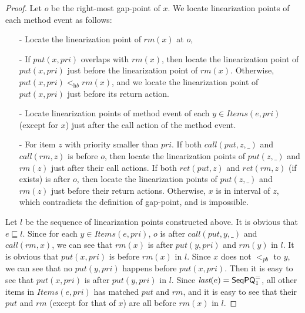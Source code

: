 \begin {proof}

Let $o$ be the right-most gap-point of $x$. We locate linearization points of each method event as follows:

\begin{itemize}
\setlength{\itemsep}{0.5pt}
\item[-] Locate the linearization point of $\textit{rm}(x)$ at $o$,

\item[-] If $\textit{put}(x,\textit{pri})$ overlaps with $\textit{rm}(x)$, then locate the linearization point of $\textit{put}(x,\textit{pri})$ just before the linearization point of $\textit{rm}(x)$. Otherwise, $\textit{put}(x,\textit{pri}) <_{\textit{hb}} \textit{rm}(x)$, and we locate the linearization point of $\textit{put}(x,\textit{pri})$ just before its return action.

\item[-] Locate linearization points of method event of each $y \in \textit{Items}(e,\textit{pri})$ (except for $x$) just after the call action of the method event.

\item[-] For item $z$ with priority smaller than $\textit{pri}$. If both $\textit{call}(\textit{put},z,\_)$ and $\textit{call}(\textit{rm},z)$ is before $o$, then locate the linearization points of $\textit{put}(z,\_)$ and $\textit{rm}(z)$ just after their call actions. If both $\textit{ret}(\textit{put},z)$ and $\textit{ret}(\textit{rm},z)$ (if exists) is after $o$, then locate the linearization points of $\textit{put}(z,\_)$ and $\textit{rm}(z)$ just before their return actions. Otherwise, $x$ is in interval of $z$, which contradicts the definition of gap-point, and is impossible.
\end{itemize}

Let $l$ be the sequence of linearization points constructed above. It is obvious that $e \sqsubseteq l$. Since for each $y \in \textit{Items}(e,\textit{pri})$, $o$ is after $\textit{call}(\textit{put},y,\_)$ and $\textit{call}(\textit{rm},x)$, we can see that $\textit{rm}(x)$ is after $\textit{put}(y,\textit{pri})$ and $\textit{rm}(y)$ in $l$. It is obvious that $\textit{put}(x,\textit{pri})$ is before $\textit{rm}(x)$ in $l$. Since $x$ does not $<_{\textit{pb}}$ to $y$, we can see that no $\textit{put}(y,\textit{pri})$ happens before $\textit{put}(x,\textit{pri})$. Then it is easy to see that $\textit{put}(x,\textit{pri})$ is after $\textit{put}(y,\textit{pri})$ in $l$. Since $\textit{last}(e) = \mathsf{SeqPQ}_1^{=}$, all other items in $\textit{Items}(e,\textit{pri})$ has matched $\textit{put}$ and $\textit{rm}$, and it is easy to see that their $\textit{put}$ and $\textit{rm}$ (except for that of $x$) are all before $\textit{rm}(x)$ in $l$.


\end{proof}

